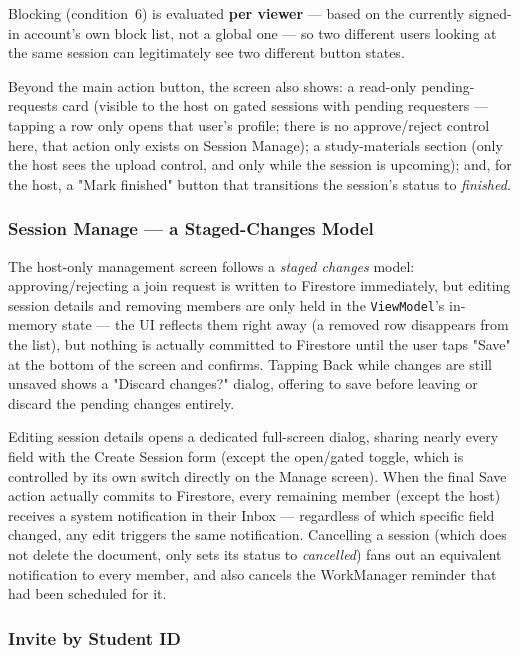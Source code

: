 Blocking (condition~6) is evaluated \textbf{per viewer} — based on the currently signed-in account's own block list, not a global one — so two different users looking at the same session can legitimately see two different button states.

Beyond the main action button, the screen also shows: a read-only pending-requests card (visible to the host on gated sessions with pending requesters — tapping a row only opens that user's profile; there is no approve/reject control here, that action only exists on Session Manage); a study-materials section (only the host sees the upload control, and only while the session is upcoming); and, for the host, a "Mark finished" button that transitions the session's status to \emph{finished}.

\subsubsection{Session Manage --- a Staged-Changes Model}

The host-only management screen follows a \emph{staged changes} model: approving/rejecting a join request is written to Firestore immediately, but editing session details and removing members are only held in the \texttt{ViewModel}'s in-memory state — the UI reflects them right away (a removed row disappears from the list), but nothing is actually committed to Firestore until the user taps "Save" at the bottom of the screen and confirms. Tapping Back while changes are still unsaved shows a "Discard changes?" dialog, offering to save before leaving or discard the pending changes entirely.

Editing session details opens a dedicated full-screen dialog, sharing nearly every field with the Create Session form (except the open/gated toggle, which is controlled by its own switch directly on the Manage screen). When the final Save action actually commits to Firestore, every remaining member (except the host) receives a system notification in their Inbox — regardless of which specific field changed, any edit triggers the same notification. Cancelling a session (which does not delete the document, only sets its status to \emph{cancelled}) fans out an equivalent notification to every member, and also cancels the WorkManager reminder that had been scheduled for it.

\subsubsection{Invite by Student ID}

